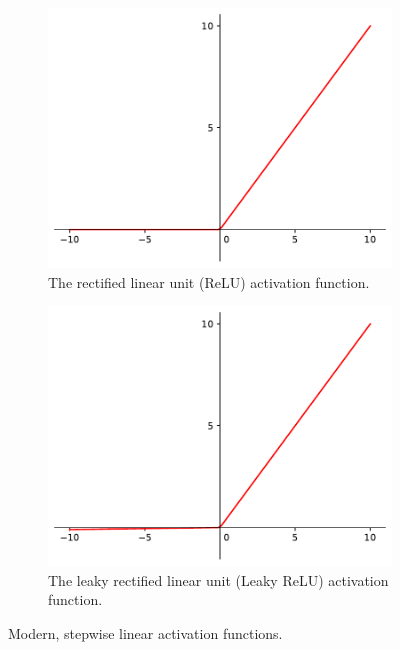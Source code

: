 \begin{figure}
    \centering
    \begin{subfigure}[b]{0.45\textwidth}
        \includegraphics[width=\textwidth]{relu}
        \caption{The rectified linear unit (ReLU) activation function.}
        \label{fig:relu}
    \end{subfigure}
    \hfill
    \begin{subfigure}[b]{0.45\textwidth}
        \includegraphics[width=\textwidth]{leaky_relu.pdf}
        \caption{The leaky rectified linear unit (Leaky ReLU) activation function.}
        \label{fig:leaky-relu}
    \end{subfigure}
    
    \caption{Modern, stepwise linear activation functions.}
    \label{fig:subfigures}
\end{figure}


